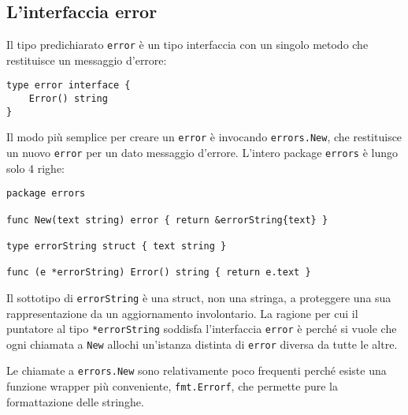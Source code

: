 \documentclass[../../thesis.tex]{subfiles}
\begin{document}
    \subsection{L'interfaccia error}\label{subsec:l'interfaccia-error}
    Il tipo predichiarato \verb"error" è un tipo interfaccia con un singolo metodo che restituisce un messaggio d'errore:
    \begin{lstlisting}[frame = single,label={lst:lstlisting6-6.1}]
type error interface {
    Error() string
}
    \end{lstlisting}
    Il modo più semplice per creare un \verb"error" è invocando \verb"errors.New", che restituisce un nuovo \verb"error" per un dato messaggio d'errore.
    L'intero package \verb"errors" è lungo solo 4 righe:
    \begin{lstlisting}[frame = single,label={lst:lstlisting6-6.2}]
package errors

func New(text string) error { return &errorString{text} }

type errorString struct { text string }

func (e *errorString) Error() string { return e.text }
    \end{lstlisting}
    Il sottotipo di \verb"errorString" è una struct, non una stringa, a proteggere una sua rappresentazione da un aggiornamento involontario.
    La ragione per cui il puntatore al tipo \verb"*errorString" soddisfa l'interfaccia \verb"error" è perché si vuole che ogni chiamata a \verb"New" allochi un'istanza distinta di \verb"error" diversa da tutte le altre.
    \hfill \vspace{12pt}

    Le chiamate a \verb"errors.New" sono relativamente poco frequenti perché esiste una funzione wrapper più conveniente, \verb"fmt.Errorf", che permette pure la formattazione delle stringhe.
\end{document}
